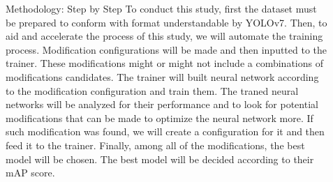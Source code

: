 \documentclass[final,hyperref={pdfpagelabels=false}]{beamer}
\begin{document}
\begin{frame}[t]
\begin{columns}[t]
\begin{column}{.465\textwidth}
%  
%  

\end{column} %

\begin{column}{.03\textwidth}\end{column} %
 
\begin{column}{.465\textwidth} %

\begin{block}{Methodology: Step by Step}
  To conduct this study, first the dataset must be prepared to conform with format understandable by YOLOv7.
  Then, to aid and accelerate the process of this study, we will automate the training process.
  Modification configurations will be made and then inputted to the trainer. 
  These modifications might or might not include a combinations of modifications candidates.
  The trainer will built neural network according to the modification configuration and train them.
  The traned neural networks will be analyzed for their performance and to look for potential modifications that can be made to optimize the neural network more.
  If such modification was found, we will create a configuration for it and then feed it to the trainer.
  Finally, among all of the modifications, the best model will be chosen.
  The best model will be decided according to their mAP score.
\end{block}



\end{column}
\end{columns}
\end{frame}
\end{document}
